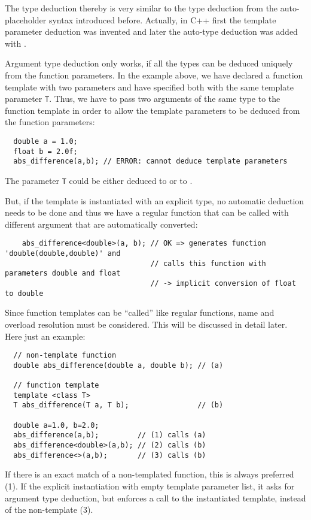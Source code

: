 The type deduction thereby is very similar to the  type deduction from the auto-placeholder syntax introduced before.
Actually, in C++ first the template parameter deduction was invented and later the auto-type deduction was added with .

\begin{rem}
  Argument type deduction only works, if all the types can be deduced uniquely from the function parameters. In the example above, we have
  declared a function template with two parameters and have specified both with the same template parameter \texttt{T}. Thus, we have to
  pass two arguments of the same type to the function template in order to allow the template parameters to be deduced from the
  function parameters:
  \begin{verbatim}
  double a = 1.0;
  float b = 2.0f;
  abs_difference(a,b); // ERROR: cannot deduce template parameters
  \end{verbatim}
  The parameter \texttt{T} could be either deduced to  or to .

  But, if the template is instantiated with an explicit type, no automatic deduction needs to be done and thus we have a regular
  function that can be called with different argument that are automatically converted:
  \begin{verbatim}
    abs_difference<double>(a, b); // OK => generates function 'double(double,double)' and
                                  // calls this function with parameters double and float
                                  // -> implicit conversion of float to double
  \end{verbatim}
\end{rem}

Since function templates can be ``called'' like regular functions, name and overload resolution must be considered. This will be discussed in detail
later. Here just an example:
\begin{verbatim}
  // non-template function
  double abs_difference(double a, double b); // (a)

  // function template
  template <class T>
  T abs_difference(T a, T b);                // (b)

  double a=1.0, b=2.0;
  abs_difference(a,b);         // (1) calls (a)
  abs_difference<double>(a,b); // (2) calls (b)
  abs_difference<>(a,b);       // (3) calls (b)
\end{verbatim}
If there is an exact match of a non-templated function, this is always preferred (1). If the explicit instantiation with empty template parameter list,
it asks for argument type deduction, but enforces a call to the instantiated template, instead of the non-template (3).


